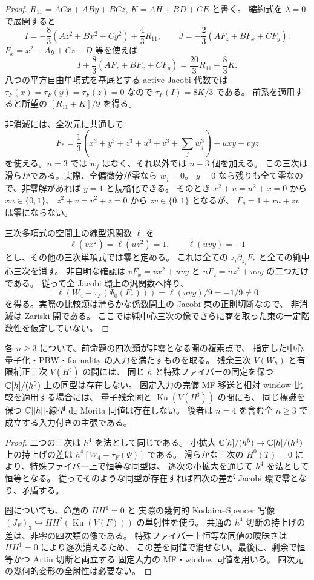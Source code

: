 \begin{proof}
$R_{11}=ACx+ABy+BCz$, $K=AH+BD+CE$ と書く。
縮約式を $\lambda=0$ で展開すると
\[
 I=-\frac83(Az^2+Bx^2+Cy^2)+\frac43R_{11},\qquad
 J=-\frac23(AF_z+BF_x+CF_y).
\]
$F_x=x^2+Ay+Cz+D$ 等を使えば
\[
 I+\frac83(AF_z+BF_x+CF_y)
        =\frac{20}{3}R_{11}+\frac83K.
\]
八つの平方自由単項式を基底とする active Jacobi 代数では
$\tau_F(x)=\tau_F(y)=\tau_F(z)=0$ なので $\tau_F(I)=8K/3$ である。
前系を適用すると所望の $[R_{11}+K]/9$ を得る。

非消滅には、全次元に共通して
\[
 F_*=\frac13\left(x^3+y^3+z^3+u^3+v^3+\sum_j w_j^3\right)
                    +u xy+v yz
\]
を使える。$n=3$ では $w_j$ はなく、それ以外では $n-3$ 個を加える。
この三次は滑らかである。実際、全偏微分が零なら $w_j=0$。
$y=0$ なら残りも全て零なので、非零解があれば $y=1$ と規格化できる。
そのとき $x^2+u=u^2+x=0$ から $xu\in\{0,1\}$、
$z^2+v=v^2+z=0$ から $zv\in\{0,1\}$ となるが、
$F_y=1+xu+zv$ は零にならない。

三次多項式の空間上の線型汎関数 $\ell$ を
\[
 \ell(vx^2)=\ell(uz^2)=1,\qquad \ell(uvy)=-1
\]
とし、その他の三次単項式では零と定める。
これは全ての $z_i\partial_{z_j}F_*$ と全ての純中心三次を消す。
非自明な確認は
$vF_x=vx^2+uvy$ と $uF_z=uz^2+uvy$ の二つだけである。
従って全 Jacobi 環上の汎関数へ降り、
\[
 \ell\left(W_4-\tau_F(\Psi_0(F_*))\right)
      =\ell(uvy)/9=-1/9\ne0
\]
を得る。実際の比較類は滑らかな係数開上の Jacobi 束の正則切断なので、
非消滅は Zariski 開である。
ここでは純中心三次の像でさらに商を取った束の一定階数性を仮定していない。
\end{proof}

\begin{corollary}
\label{cor:nfm-corrected-fourth-obstruction}
各 $n\ge3$ について、前命題の四次類が非零となる開の複素点で、
指定した中心量子化・PBW・formality の入力を満たすものを取る。
残余三次 $V(W_h)$ と有限補正三次 $V(H^\sharp)$ の間には、
同じ $h$ と特殊ファイバーの同定を保つ
$\mathbb C[h]/(h^5)$ 上の同型は存在しない。
固定入力の完備 MF 移送と相対 window 比較を適用する場合には、
量子残余圏と $\operatorname{Ku}(V(H^\sharp))$ の間にも、
同じ標識を保つ $\mathbb C[[h]]$-線型 dg Morita 同値は存在しない。
後者は $n=4$ を含む全 $n\ge3$ で成立する入力付きの主張である。
\end{corollary}

\begin{proof}
二つの三次は $h^4$ を法として同じである。
小拡大 $\mathbb C[h]/(h^5)\to\mathbb C[h]/(h^4)$ 上の持上げの差は
$h^4[W_4-\tau_F(\Psi)]$ である。
滑らかな三次の $H^0(T)=0$ により、特殊ファイバー上で恒等な同型は、
逐次の小拡大を通じて $h^4$ を法として恒等となる。
従ってそのような同型が存在すれば四次の差が Jacobi 環で零となり、矛盾する。

圏についても、命題の $HH^1=0$ と
実際の幾何的 Kodaira--Spencer 写像
$(J_F)_3\hookrightarrow HH^2(\operatorname{Ku}(V(F)))$ の単射性を使う。
共通の $h^4$ 切断の持上げの差は、非零の四次類の像である。
特殊ファイバー上恒等な同値の曖昧さは $HH^1=0$ により逐次消えるため、
この差を同値で消せない。最後に、剰余で恒等かつ Artin 切断と両立する
固定入力の MF・window 同値を用いる。
四次元の幾何的変形の全射性は必要ない。
\end{proof}

